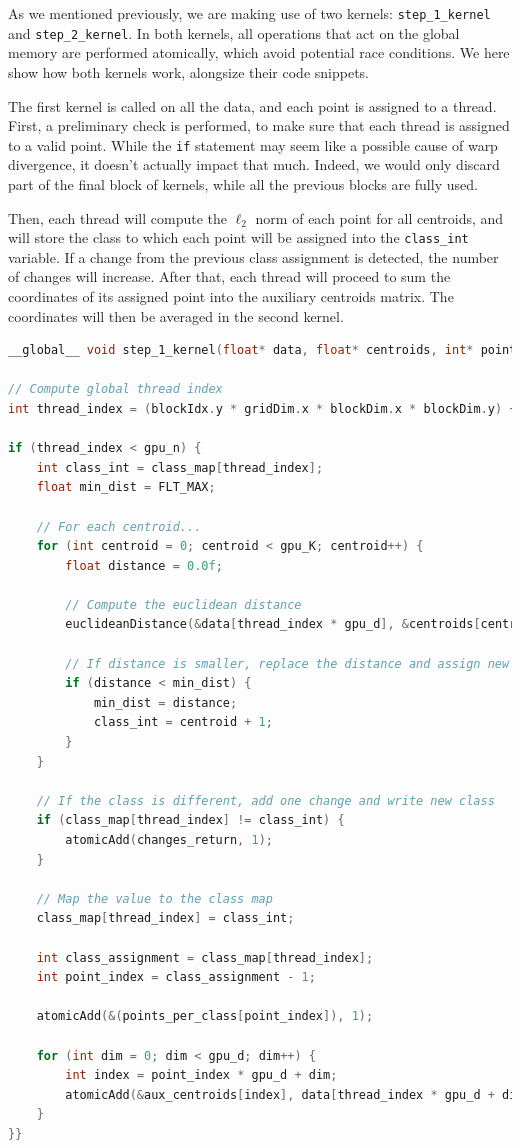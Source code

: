 \documentclass[11pt, journal]{IEEEtran}
\newcommand{\nwl}{

\vspace{11pt}

}
\begin{document}
As we mentioned previously, we are making use of two kernels: \verb|step_1_kernel| and \verb|step_2_kernel|. In both kernels, all operations that act on the global memory are performed atomically, which avoid potential race conditions. We here show how both kernels work, alongsize their code snippets.
\nwl
The first kernel is called on all the data, and each point is assigned to a thread. First, a preliminary check is performed, to make sure that each thread is assigned to a valid point. While the \verb|if| statement may seem like a possible cause of warp divergence, it doesn't actually impact that much. Indeed, we would only discard part of the final block of kernels, while all the previous blocks are fully used.
\nwl
Then, each thread will compute the $\ell_2$ norm of each point for all centroids, and will store the class to which each point will be assigned into the \verb|class_int| variable. If a change from the previous class assignment is detected, the number of changes will increase. After that, each thread will proceed to sum the coordinates of its assigned point into the auxiliary centroids matrix. The coordinates will then be averaged in the second kernel.
\nwl
\begin{lstlisting}[language = C]
__global__ void step_1_kernel(float* data, float* centroids, int* points_per_class, float* aux_centroids, int* class_map, int* changes_return) {

// Compute global thread index
int thread_index = (blockIdx.y * gridDim.x * blockDim.x * blockDim.y) + (blockIdx.x * blockDim.x * blockDim.y) + (threadIdx.y * blockDim.x) + threadIdx.x;

if (thread_index < gpu_n) {
    int class_int = class_map[thread_index];
    float min_dist = FLT_MAX;
    
    // For each centroid...
    for (int centroid = 0; centroid < gpu_K; centroid++) {
        float distance = 0.0f;

        // Compute the euclidean distance
        euclideanDistance(&data[thread_index * gpu_d], &centroids[centroid * gpu_d], gpu_d, &distance);

        // If distance is smaller, replace the distance and assign new class
        if (distance < min_dist) {
            min_dist = distance;
            class_int = centroid + 1;
        }
    }

    // If the class is different, add one change and write new class
    if (class_map[thread_index] != class_int) {
        atomicAdd(changes_return, 1);
    }
    
    // Map the value to the class map
    class_map[thread_index] = class_int;

    int class_assignment = class_map[thread_index];
    int point_index = class_assignment - 1;

    atomicAdd(&(points_per_class[point_index]), 1);

    for (int dim = 0; dim < gpu_d; dim++) {
        int index = point_index * gpu_d + dim;
        atomicAdd(&aux_centroids[index], data[thread_index * gpu_d + dim]);
    }
}}\end{lstlisting}
\end{document}
